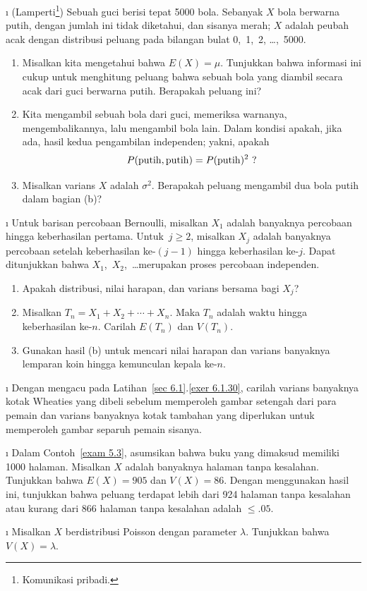 \begin{LJSItem}
\i\label{exer 6.2.26} (Lamperti\footnote{Komunikasi pribadi.})
Sebuah guci berisi tepat 5000 bola. Sebanyak $X$ bola berwarna putih, dengan jumlah
ini tidak diketahui, dan sisanya merah; $X$ adalah peubah acak dengan distribusi peluang pada
bilangan bulat 0,~1,~2, \dots,~5000.
\begin{enumerate}
\item Misalkan kita mengetahui bahwa $E(X) = \mu$.  Tunjukkan bahwa informasi ini
cukup untuk menghitung peluang bahwa sebuah bola yang diambil secara acak dari guci
berwarna putih.  Berapakah peluang ini?

\item Kita mengambil sebuah bola dari guci, memeriksa warnanya, mengembalikannya,
lalu mengambil bola lain.  Dalam kondisi apakah, jika ada, hasil kedua pengambilan
independen; yakni, apakah
$$
 P({{\rm putih},{\rm putih}}) =  P({{\rm putih}})^2\ ?
$$

\item Misalkan varians $X$ adalah $\sigma^2$.  Berapakah peluang mengambil dua bola
putih dalam bagian (b)?

\end{enumerate}


\i\label{exer 6.2.27} Untuk barisan percobaan Bernoulli, misalkan $X_1$ adalah
banyaknya percobaan hingga keberhasilan pertama.  Untuk~$j \geq 2$, misalkan $X_j$
adalah banyaknya percobaan setelah keberhasilan ke-$(j - 1)$ hingga keberhasilan
ke-$j$.  Dapat ditunjukkan bahwa $X_1$,~$X_2$,~\dots merupakan proses percobaan
independen.
\begin{enumerate}
\item Apakah distribusi, nilai harapan, dan varians bersama bagi $X_j$?

\item Misalkan $T_n = X_1 + X_2 +\cdots+ X_n$.  Maka $T_n$ adalah waktu hingga
keberhasilan ke-$n$.  Carilah $E(T_n)$ dan $V(T_n)$.

\item Gunakan hasil (b) untuk mencari nilai harapan dan varians banyaknya lemparan
koin hingga kemunculan kepala ke-$n$.
\end{enumerate}

\i\label{exer 6.2.28} Dengan mengacu pada
Latihan~\ref{sec 6.1}.\ref{exer 6.1.30}, carilah varians banyaknya kotak Wheaties yang
dibeli sebelum memperoleh gambar setengah dari para pemain dan varians banyaknya kotak
tambahan yang diperlukan untuk memperoleh gambar separuh pemain sisanya.

\i\label{exer 6.2.99} Dalam Contoh~\ref{exam 5.3}, asumsikan bahwa buku yang dimaksud
memiliki 1000 halaman.  Misalkan $X$ adalah banyaknya halaman tanpa kesalahan.
Tunjukkan bahwa $E(X) = 905$ dan $V(X) = 86$.  Dengan menggunakan hasil ini, tunjukkan
bahwa peluang terdapat lebih dari 924 halaman tanpa kesalahan atau kurang dari 866
halaman tanpa kesalahan adalah ${} \leq .05$.

\i\label{exer 6.2.100} Misalkan $X$ berdistribusi Poisson dengan parameter
$\lambda$.  Tunjukkan bahwa $V(X) = \lambda$.

\end{LJSItem}

